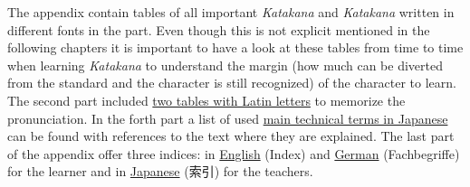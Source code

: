 The appendix contain tables of all important \textit{Katakana} and
\textit{Katakana} written in different fonts in the
 part. Even though this is not explicit mentioned
in the following chapters it is important to have a look at these tables from
time to time when learning \textit{Katakana} to understand the margin (how
much can be diverted from the standard and the character is still recognized)
of the character to learn. The second part included
\hyperref[chap:RomajiTables]{two tables with Latin letters} to memorize the
pronunciation. In the forth part a list of used
\hyperref[chap:ListOfJapaneseTechnicalTerms]{main technical terms in Japanese}
can be found with references to the text where they are explained.  The last
part of the appendix offer three indices: in
\hyperref[chap:EnglishIndex]{English} (Index) and
\hyperref[chap:GermanIndex]{German} (Fachbegriffe) for the learner and in
\hyperref[chap:JapaneseIndex]{Japanese} (索引) for the teachers. 




